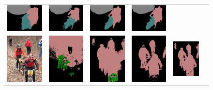 \begin{figure}[!htbp]
{\begin{tabular}{c c c c c c}
    \includegraphics[height=0.122\linewidth]{fig/val_crf_vis/bbox/2011_002322.png} &
    \includegraphics[height=0.122\linewidth]{fig/val_crf_vis/bbox_crf/2011_002322.png} &
    \includegraphics[height=0.122\linewidth]{fig/val_crf_vis/strongweak/2011_002322.png} &
    \includegraphics[height=0.122\linewidth]{fig/val_crf_vis/cocomix/2011_002322.png} \\
    \includegraphics[height=0.13\linewidth]{fig/val_crf_vis/img/2007_001630.jpg} &
    \includegraphics[height=0.13\linewidth]{fig/val_crf_vis/adaweak/2007_001630.png} &
    \includegraphics[height=0.13\linewidth]{fig/val_crf_vis/bbox/2007_001630.png} &
    \includegraphics[height=0.13\linewidth]{fig/val_crf_vis/bbox_crf/2007_001630.png} &
    \includegraphics[height=0.13\linewidth]{fig/val_crf_vis/strongweak/2007_001630.png} &

\end{tabular}}
\end{figure}

